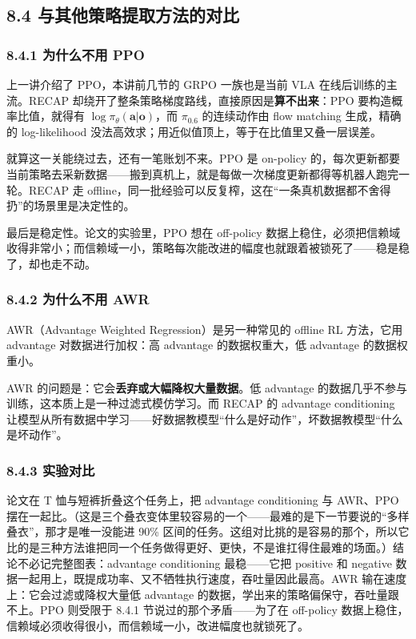 \documentclass[
  chinese,
]{ctexart}
\begin{document}
\subsection{8.4
与其他策略提取方法的对比}\label{ux4e0eux5176ux4ed6ux7b56ux7565ux63d0ux53d6ux65b9ux6cd5ux7684ux5bf9ux6bd4}

\subsubsection{8.4.1 为什么不用
PPO}\label{ux4e3aux4ec0ux4e48ux4e0dux7528-ppo}

上一讲介绍了 PPO，本讲前几节的 GRPO 一族也是当前 VLA
在线后训练的主流。RECAP
却绕开了整条策略梯度路线，直接原因是\textbf{算不出来}：PPO
要构造概率比值，就得有 \(\log \pi_\theta(\mathbf{a}|\mathbf{o})\)，而
\(\pi_{0.6}\) 的连续动作由 flow matching 生成，精确的 log-likelihood
没法高效求；用近似值顶上，等于在比值里又叠一层误差。

就算这一关能绕过去，还有一笔账划不来。PPO 是 on-policy
的，每次更新都要当前策略去采新数据------搬到真机上，就是每做一次梯度更新都得等机器人跑完一轮。RECAP
走
offline，同一批经验可以反复榨，这在``一条真机数据都不舍得扔''的场景里是决定性的。

最后是稳定性。论文的实验里，PPO 想在 off-policy
数据上稳住，必须把信赖域收得非常小；而信赖域一小，策略每次能改进的幅度也就跟着被锁死了------稳是稳了，却也走不动。

\subsubsection{8.4.2 为什么不用
AWR}\label{ux4e3aux4ec0ux4e48ux4e0dux7528-awr}

AWR（Advantage Weighted Regression）是另一种常见的 offline RL 方法，它用
advantage 对数据进行加权：高 advantage 的数据权重大，低 advantage
的数据权重小。

AWR 的问题是：它会\textbf{丢弃或大幅降权大量数据}。低 advantage
的数据几乎不参与训练，这本质上是一种过滤式模仿学习。而 RECAP 的
advantage conditioning
让模型从所有数据中学习------好数据教模型``什么是好动作''，坏数据教模型``什么是坏动作''。

\subsubsection{8.4.3 实验对比}\label{ux5b9eux9a8cux5bf9ux6bd4}

论文在 T 恤与短裤折叠这个任务上，把 advantage conditioning 与 AWR、PPO
摆在一起比。（这是三个叠衣变体里较容易的一个------最难的是下一节要说的``多样叠衣''，那才是唯一没能进
90\%
区间的任务。这组对比挑的是容易的那个，所以它比的是三种方法谁把同一个任务做得更好、更快，不是谁扛得住最难的场面。）结论不必记完整图表：advantage
conditioning 最稳------它把 positive 和 negative
数据一起用上，既提成功率、又不牺牲执行速度，吞吐量因此最高。AWR
输在速度上：它会过滤或降权大量低 advantage
的数据，学出来的策略偏保守，吞吐量跟不上。PPO 则受限于 8.4.1
节说过的那个矛盾------为了在 off-policy
数据上稳住，信赖域必须收得很小，而信赖域一小，改进幅度也就锁死了。
\end{document}
